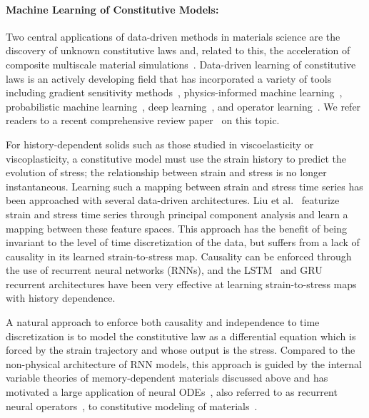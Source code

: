 \documentclass[letterpaper,11pt]{article}
\begin{document}
\paragraph{Machine Learning of Constitutive Models:}
Two central applications of data-driven methods in materials science are the discovery of unknown constitutive laws and, related to this, the acceleration of composite multiscale material simulations~\cite{liu2021review}. Data-driven learning of constitutive laws is an actively developing field that has incorporated a variety of tools including gradient sensitivity methods~\cite{akerson2024learning}, physics-informed machine learning~\cite{haghighat2023constitutive}, probabilistic machine learning~\cite{fuhg2022physics}, deep learning~\cite{liu2019deep}, and operator learning~\cite{bhattacharya2024learning}. We refer readers to a recent comprehensive review paper~\cite{fuhg2024review} on this topic.

For history-dependent solids such as those studied in viscoelasticity or viscoplasticity, a constitutive model must use the strain history to predict the evolution of stress; the relationship between strain and stress is no longer instantaneous. Learning such a mapping between strain and stress time series has been approached with several data-driven architectures. Liu et al.~\cite{liu2022learning} featurize strain and stress time series through principal component analysis and learn a mapping between these feature spaces. This approach has the benefit of being invariant to the level of time discretization of the data, but suffers from a lack of causality in its learned strain-to-stress map. Causality can be enforced through the use of recurrent neural networks (RNNs), and the LSTM~\cite{ghavamian2019accelerating} and  GRU~\cite{mozaffar2019deep} recurrent architectures have been very effective at learning strain-to-stress maps with history dependence.

A natural approach to enforce both causality and independence to time discretization is to model the constitutive law as a differential equation which is forced by the strain trajectory and whose output is the stress. Compared to the non-physical architecture of RNN models, this approach is guided by the internal variable theories of memory-dependent materials discussed above and has motivated a large application of neural ODEs~\cite{chen2018neural, jones2022neural}, also referred to as recurrent neural operators~\cite{liu2023learning}, to constitutive modeling of materials~\cite{bhattacharya2023learning, jones2022neural, karimi2024learning, liu2023learning, zhang2024iterated}.~\\
\end{document}
